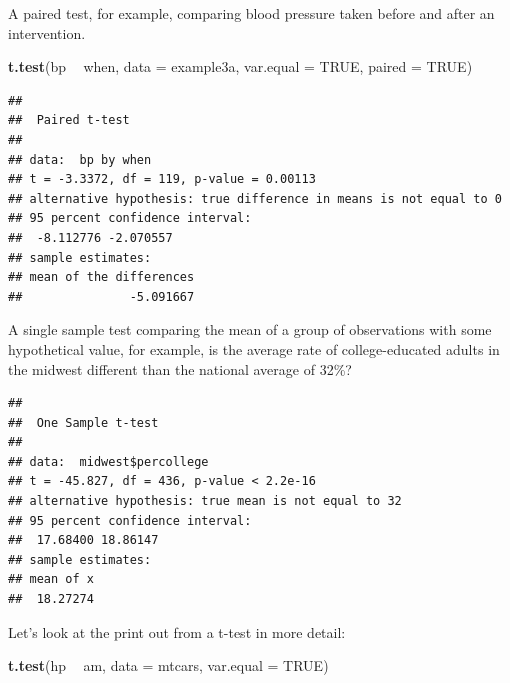\documentclass[]{book}
\newenvironment{Shaded}{\begin{snugshade}}{\end{snugshade}}
\newcommand{\DataTypeTok}[1]{\textcolor[rgb]{0.13,0.29,0.53}{#1}}
\newcommand{\DecValTok}[1]{\textcolor[rgb]{0.00,0.00,0.81}{#1}}
\newcommand{\KeywordTok}[1]{\textcolor[rgb]{0.13,0.29,0.53}{\textbf{#1}}}
\newcommand{\NormalTok}[1]{#1}
\newcommand{\OperatorTok}[1]{\textcolor[rgb]{0.81,0.36,0.00}{\textbf{#1}}}
\newcommand{\OtherTok}[1]{\textcolor[rgb]{0.56,0.35,0.01}{#1}}
\newcommand{\StringTok}[1]{\textcolor[rgb]{0.31,0.60,0.02}{#1}}
\begin{document}
A paired test, for example, comparing blood pressure taken before and
after an intervention.

\begin{Shaded}
\begin{Highlighting}[]
\KeywordTok{t.test}\NormalTok{(bp }\OperatorTok{~}\StringTok{ }\NormalTok{when, }\DataTypeTok{data =}\NormalTok{ example3a, }\DataTypeTok{var.equal =} \OtherTok{TRUE}\NormalTok{, }\DataTypeTok{paired =} \OtherTok{TRUE}\NormalTok{)}
\end{Highlighting}
\end{Shaded}

\begin{verbatim}
## 
##  Paired t-test
## 
## data:  bp by when
## t = -3.3372, df = 119, p-value = 0.00113
## alternative hypothesis: true difference in means is not equal to 0
## 95 percent confidence interval:
##  -8.112776 -2.070557
## sample estimates:
## mean of the differences 
##               -5.091667
\end{verbatim}

A single sample test comparing the mean of a group of observations with
some hypothetical value, for example, is the average rate of
college-educated adults in the midwest different than the national
average of 32\%?

\begin{Shaded}
\end{Shaded}

\begin{verbatim}
## 
##  One Sample t-test
## 
## data:  midwest$percollege
## t = -45.827, df = 436, p-value < 2.2e-16
## alternative hypothesis: true mean is not equal to 32
## 95 percent confidence interval:
##  17.68400 18.86147
## sample estimates:
## mean of x 
##  18.27274
\end{verbatim}

Let's look at the print out from a t-test in more detail:

\begin{Shaded}
\begin{Highlighting}[]
\KeywordTok{t.test}\NormalTok{(hp }\OperatorTok{~}\StringTok{ }\NormalTok{am, }\DataTypeTok{data =}\NormalTok{ mtcars, }\DataTypeTok{var.equal =} \OtherTok{TRUE}\NormalTok{)}
\end{Highlighting}
\end{Shaded}
\end{document}
